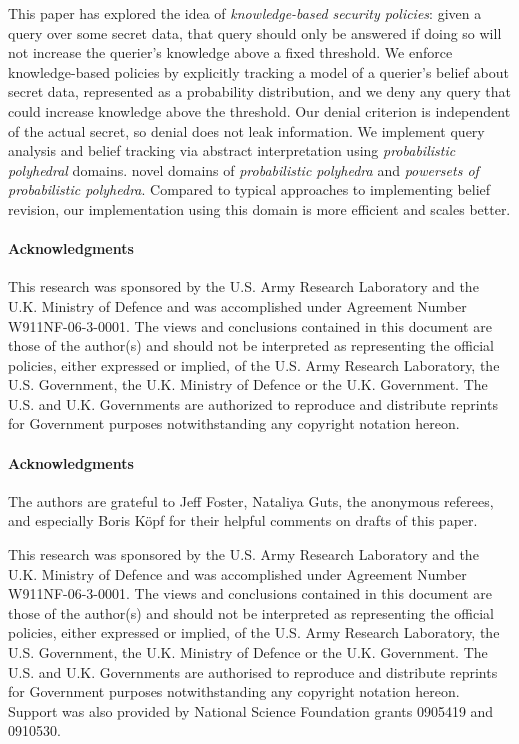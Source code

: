 \documentclass[10pt,conference,compsocconf]{IEEEtran}
\begin{document}
This paper has explored the idea of \emph{knowledge-based security
  policies}: given a query over some secret data, that query should
only be answered if doing so will not increase the querier's knowledge
above a fixed threshold.  We enforce knowledge-based policies by
explicitly tracking a model of a querier's belief about secret data,
represented as a probability distribution, and we deny any query that
could increase knowledge above the threshold.  Our denial criterion
is independent of the actual secret, so denial does not leak
information.  We implement query analysis and belief tracking via
abstract interpretation using 
\ifacita
\emph{probabilistic polyhedral} domains.
\else
novel domains of \emph{probabilistic
  polyhedra} and \emph{powersets of probabilistic polyhedra}.
\fi
Compared to typical approaches to implementing belief revision, our
implementation using this domain is more efficient and scales better.

\ifacita
\vspace*{.05in}
\begin{small}
\paragraph*{Acknowledgments}
This research was sponsored by the U.S. Army Research Laboratory and
the U.K. Ministry of Defence and was accomplished under Agreement
Number W911NF-06-3-0001. The views and conclusions contained in this
document are those of the author(s) and should not be interpreted as
representing the official policies, either expressed or implied, of
the U.S. Army Research Laboratory, the U.S. Government, the
U.K. Ministry of Defence or the U.K. Government. The U.S. and
U.K. Governments are authorized to reproduce and distribute reprints
for Government purposes notwithstanding any copyright notation hereon.
\end{small}

\else
\vspace*{.1in}
\begin{small}
\paragraph*{Acknowledgments} The authors are
grateful to Jeff Foster, Nataliya Guts, the anonymous referees, and
especially Boris K\"opf for their helpful comments on
drafts of this paper.  

This research was sponsored by the U.S. Army
Research Laboratory and the U.K. Ministry of Defence and was
accomplished under Agreement Number W911NF-06-3-0001. The views and
conclusions contained in this document are those of the author(s) and
should not be interpreted as representing the official policies,
either expressed or implied, of the U.S. Army Research Laboratory, the
U.S. Government, the U.K. Ministry of Defence or the
U.K. Government. The U.S. and U.K. Governments are authorised to
reproduce and distribute reprints for Government purposes
notwithstanding any copyright notation hereon.  Support was also
provided by National Science Foundation grants 0905419 and
0910530.
\end{small}
\fi


\balance


\iffull

\fi
\end{document}
